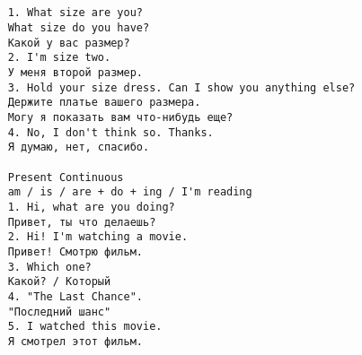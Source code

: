\subsection*{}
\begin{verbatim}
    1. What size are you?
    What size do you have?
    Какой у вас размер?
    2. I'm size two.
    У меня второй размер.
    3. Hold your size dress. Can I show you anything else?
    Держите платье вашего размера.
    Могу я показать вам что-нибудь еще?
    4. No, I don't think so. Thanks.
    Я думаю, нет, спасибо.

    Present Continuous
    am / is / are + do + ing / I'm reading
    1. Hi, what are you doing?
    Привет, ты что делаешь?
    2. Hi! I'm watching a movie.
    Привет! Смотрю фильм.
    3. Which one?
    Какой? / Который
    4. "The Last Chance".
    "Последний шанс"
    5. I watched this movie.
    Я смотрел этот фильм.
\end{verbatim}